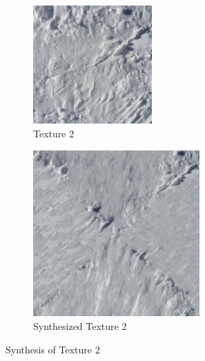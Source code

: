 \documentclass{article}
\begin{document}
\begin{figure}[H]
    \centering
    \begin{subfigure}[b]{0.49\textwidth}
        \centering
        \includegraphics[width=0.5\textwidth]{../Code/Textures/2.png}
        \caption{Texture 2}
        \label{fig:original-2}
    \end{subfigure}
    \hfill %
    \begin{subfigure}[b]{0.49\textwidth}
        \centering
        \includegraphics[width=0.7\textwidth]{../Result/2.png}
        \caption{Synthesized Texture 2}
        \label{fig:synthesized-2}
    \end{subfigure}
    \caption{Synthesis of Texture 2}
    \label{fig:synthesis-2}
\end{figure}
\end{document}
